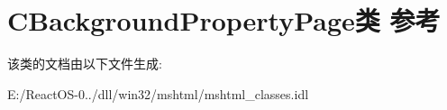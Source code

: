 \hypertarget{class_c_background_property_page}{}\section{C\+Background\+Property\+Page类 参考}
\label{class_c_background_property_page}


该类的文档由以下文件生成\+:\begin{DoxyCompactItemize}
\item 
E\+:/\+React\+O\+S-\/0../dll/win32/mshtml/mshtml\+\_\+classes.\+idl\end{DoxyCompactItemize}
